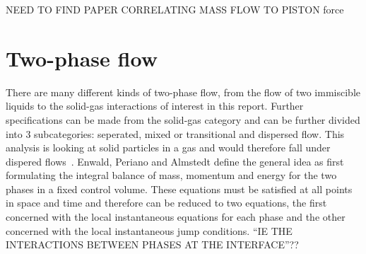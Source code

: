 

NEED TO FIND PAPER CORRELATING MASS FLOW TO PISTON force
\newpage
\section{Two-phase flow}
There are many different kinds of two-phase flow, from the flow of two immiscible liquids to the solid-gas interactions of interest in this report. Further specifications can be made from the solid-gas category and can be further divided into 3 subcategories: seperated, mixed or transitional and dispersed flow. This analysis is looking at solid particles in a gas and would therefore fall under dispered flows~\cite{enwald1996eulerian}. Enwald, Periano and Almstedt define the general idea as first formulating the integral balance of mass, momentum and energy for the two phases in a fixed control volume. These equations must be satisfied at all points in space and time and therefore can be reduced to two equations, the first concerned with the local instantaneous equations for each phase and the other concerned with the local instantaneous jump conditions. ``IE THE INTERACTIONS BETWEEN PHASES AT THE INTERFACE''??

